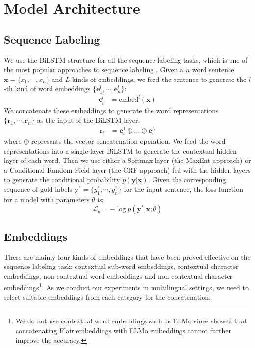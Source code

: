 \documentclass[11pt,a4paper]{article}
\newcommand{\xvec}{\mathbf{x}}
\newcommand{\yvec}{\mathbf{y}}
\newcommand{\evec}{\mathbf{e}}
\newcommand{\rvec}{\mathbf{r}}
\newcommand{\mcL}{\mathcal{L}}
\begin{document}
\section{Model Architecture}
\subsection{Sequence Labeling}
We use the BiLSTM structure for all the sequence labeling tasks, which is one of the most popular approaches to sequence labeling \cite{huang2015bidirectional,ma-hovy-2016-end}. Given a $n$ word sentence $\xvec = \{x_1, \cdots, x_n\}$ and $L$ kinds of embeddings, we feed the sentence to generate the $l$-th kind of word embeddings $\{\evec^l_1, \cdots, \evec^l_n\}$:
\begin{align}
     \evec_i^l &= \text{embed}^l (\xvec) \nonumber
\end{align}
We concatenate these embeddings to generate the word representations $\{\rvec_1, \cdots, \rvec_n\}$ as the input of the BiLSTM layer:
\begin{align}
     \rvec_i &= \evec_i^1 \oplus \dots \oplus \evec_i^L \nonumber
\end{align}
where $\oplus$ represents the vector concatenation operation. We feed the word representations into a single-layer BiLSTM to generate the contextual hidden layer of each word. Then we use either a Softmax layer (the MaxEnt approach) or a Conditional Random Field layer (the CRF approach) \cite{10.5555/645530.655813,lample-etal-2016-neural,ma-hovy-2016-end} fed with the hidden layers to generate the conditional probability $p(\yvec|\xvec)$. Given the corresponding sequence of gold labels $\yvec^* = \{y_1^*, \cdots, y_n^*\}$ for the input sentence, the loss function for a model with parameters $\theta$ is:
\begin{displaymath}
\mcL_{\theta} = - \log p(\yvec^*|\xvec;\theta)
\end{displaymath}

\subsection{Embeddings}
There are mainly four kinds of embeddings that have been proved effective on the sequence labeling task: contextual sub-word embeddings, contextual character embeddings, non-contextual word embeddings and non-contextual character embeddings\footnote{We do not use contextual word embeddings such as ELMo \cite{peters-etal-2018-deep} since \citet{akbik-etal-2018-contextual} showed that concatenating Flair embeddings with ELMo embeddings cannot further improve the accuracy.}.
As we conduct our experiments in multilingual settings, we need to select suitable embeddings from each category for the concatenation. 
\end{document}
